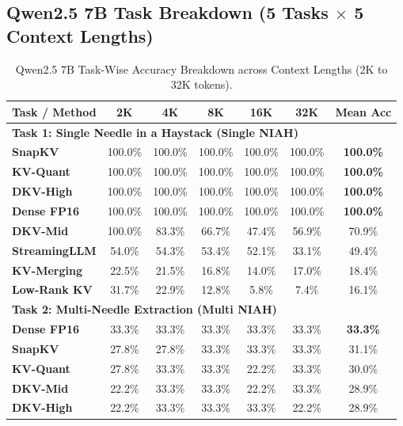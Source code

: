 \documentclass[10pt]{article}
\theoremstyle{definition}
\begin{document}
\subsection{Qwen2.5 7B Task Breakdown (5 Tasks \texorpdfstring{$\times$}{x} 5 Context Lengths)}

\begin{table}[h]
\vspace{6pt}
\centering
\small
\caption{Qwen2.5 7B Task-Wise Accuracy Breakdown across Context Lengths (2K to 32K tokens).}
\label{tab:q7b_task_breakdown}
\begin{tabular}{lcccccc}
\toprule
\textbf{Task / Method} & \textbf{2K} & \textbf{4K} & \textbf{8K} & \textbf{16K} & \textbf{32K} & \textbf{Mean Acc} \\
\midrule
\multicolumn{7}{l}{\textbf{Task 1: Single Needle in a Haystack (Single NIAH)}} \\
\textbf{SnapKV} & 100.0\% & 100.0\% & 100.0\% & 100.0\% & 100.0\% & \textbf{100.0\%} \\
\textbf{KV-Quant} & 100.0\% & 100.0\% & 100.0\% & 100.0\% & 100.0\% & \textbf{100.0\%} \\
\textbf{DKV-High} & 100.0\% & 100.0\% & 100.0\% & 100.0\% & 100.0\% & \textbf{100.0\%} \\
\textbf{Dense FP16} & 100.0\% & 100.0\% & 100.0\% & 100.0\% & 100.0\% & \textbf{100.0\%} \\
\textbf{DKV-Mid} & 100.0\% & 83.3\% & 66.7\% & 47.4\% & 56.9\% & 70.9\% \\
\textbf{StreamingLLM} & 54.0\% & 54.3\% & 53.4\% & 52.1\% & 33.1\% & 49.4\% \\
\textbf{KV-Merging} & 22.5\% & 21.5\% & 16.8\% & 14.0\% & 17.0\% & 18.4\% \\
\textbf{Low-Rank KV} & 31.7\% & 22.9\% & 12.8\% & 5.8\% & 7.4\% & 16.1\% \\
\midrule
\multicolumn{7}{l}{\textbf{Task 2: Multi-Needle Extraction (Multi NIAH)}} \\
\textbf{Dense FP16} & 33.3\% & 33.3\% & 33.3\% & 33.3\% & 33.3\% & \textbf{33.3\%} \\
\textbf{SnapKV} & 27.8\% & 27.8\% & 33.3\% & 33.3\% & 33.3\% & 31.1\% \\
\textbf{KV-Quant} & 27.8\% & 33.3\% & 33.3\% & 22.2\% & 33.3\% & 30.0\% \\
\textbf{DKV-Mid} & 22.2\% & 33.3\% & 33.3\% & 22.2\% & 33.3\% & 28.9\% \\
\textbf{DKV-High} & 22.2\% & 33.3\% & 33.3\% & 33.3\% & 22.2\% & 28.9\% \\

\end{tabular}
\end{table}
\end{document}
